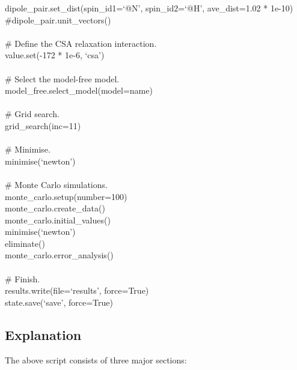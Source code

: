\begin{htmlonly}
\begin{htmlonly}
\begin{exampleenv}
dipole\_pair.set\_dist(spin\_id1=`@N', spin\_id2=`@H', ave\_dist=1.02 * 1e-10) \\
\#dipole\_pair.unit\_vectors() \\
 \\
\# Define the CSA relaxation interaction. \\
value.set(-172 * 1e-6, `csa') \\
 \\
\# Select the model-free model. \\
model\_free.select\_model(model=name) \\
 \\
\# Grid search. \\
grid\_search(inc=11) \\
 \\
\# Minimise. \\
minimise(`newton') \\
 \\
\# Monte Carlo simulations. \\
monte\_carlo.setup(number=100) \\
monte\_carlo.create\_data() \\
monte\_carlo.initial\_values() \\
minimise(`newton') \\
eliminate() \\
monte\_carlo.error\_analysis() \\
 \\
\# Finish. \\
results.write(file=`results', force=True) \\
state.save(`save', force=True)
\end{exampleenv}



\subsection{Explanation}

The above script consists of three major sections:


\end{htmlonly}
\end{htmlonly}
